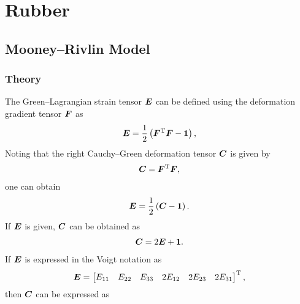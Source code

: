 \chapter{Rubber}
\section{Mooney--Rivlin Model}
\subsection{Theory}
The Green--Lagrangian strain tensor $\bm{E}$ can be defined using the deformation gradient tensor $\bm{F}$ as
\begin{gather}
    \bm{E}=\dfrac{1}{2}\left(\bm{F}^{\mathrm{T}}\bm{F}-\bm{1}\right),
\end{gather}
Noting that the right Cauchy--Green deformation tensor $\bm{C}$ is given by
\begin{gather}
    \bm{C}=\bm{F}^{\mathrm{T}}\bm{F},
\end{gather}
one can obtain
\begin{gather}
    \bm{E}=\dfrac{1}{2}\left(\bm{C}-\bm{1}\right).
\end{gather}
If $\bm{E}$ is given, $\bm{C}$ can be obtained as
\begin{gather}
    \bm{C}=2\bm{E}+\bm{1}.
\end{gather}
If $\bm{E}$ is expressed in the Voigt notation as
\begin{gather}
    \bm{E}=\begin{bmatrix}
        E_{11} & E_{22} & E_{33} & 2E_{12} & 2E_{23} & 2E_{31}
    \end{bmatrix}^{\mathrm{T}},
\end{gather}
then $\bm{C}$ can be expressed as
